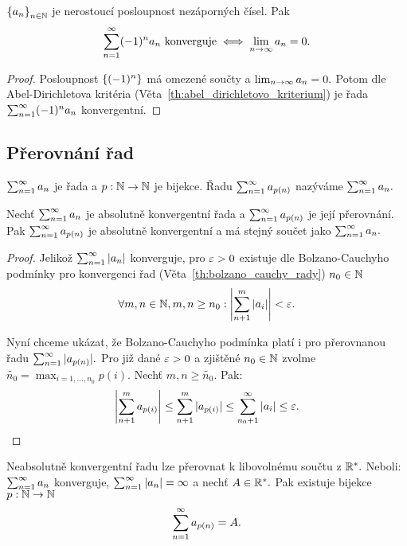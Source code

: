 \begin{theorem}
    \Necht $\left\{a_n\right\}_{n\in\mathbb{N}}$ je nerostoucí posloupnost nezáporných čísel.
    Pak
    $$\sum_{n=1}^\infty (-1)^na_n \text{ konverguje} \iff \lim_{n \to \infty} a_n = 0.$$
\end{theorem}

\begin{proof}
    Posloupnost $\left\{(-1)^n\right\}$ má omezené součty a $\lim_{n \to \infty} a_n = 0.$ Potom
    dle Abel-Dirichletova kritéria (Věta~\ref{th:abel_dirichletovo_kriterium})
    je řada $\sum_{n=1}^\infty (-1)^na_n$ konvergentní.
\end{proof}

\subsection{Přerovnání řad}

\begin{definition}
    \Necht $\sum_{n=1}^\infty a_n$ je řada a $p: \mathbb{N} \rightarrow \mathbb{N}$ je bijekce. Řadu 
    $\sum_{n=1}^\infty a_{p(n)}$ nazýváme  $\sum_{n=1}^\infty a_n.$
\end{definition}

\begin{theorem}
    Nechť $\sum_{n=1}^\infty a_n$ je absolutně konvergentní řada a $\sum_{n=1}^\infty a_{p(n)}$ je její
    přerovnání. Pak $\sum_{n=1}^\infty a_{p(n)}$ je absolutně konvergentní a má stejný součet
    jako $\sum_{n=1}^\infty a_n.$
\end{theorem}

\begin{proof}
    Jelikož $\sum_{n=1}^\infty |a_n|$ konverguje, pro $\varepsilon > 0$ existuje dle Bolzano-Cauchyho
    podmínky pro konvergenci řad (Věta~\ref{th:bolzano_cauchy_rady}) 
    $n_0 \in \mathbb{N}$ \tz
    $$\forall m,n \in \mathbb{N}, m,n \geq n_0: \left|\sum_{n+1}^m |a_i|\right| < \varepsilon.$$
    
    Nyní chceme ukázat, že Bolzano-Cauchyho podmínka platí i pro 
    přerovnanou řadu $\sum_{n=1}^\infty |a_{p(n)}|.$ Pro již dané $\varepsilon > 0$ a zjištěné 
    $n_0 \in \mathbb{N}$ zvolme
    $\widetilde{n_0} = \max_{i=1, \dots, n_0} p(i).$ Nechť $m,n\geq 
    \widetilde{n_0}.$ Pak:
    $$\left|\sum_{n+1}^m a_{p(i)}\right| 
    \leq \sum_{n+1}^m |a_{p(i)}| 
    \leq \sum_{n_0+1}^\infty |a_i| 
    \leq \varepsilon.$$
\end{proof}

\begin{theorem}[Riemann]
    Neabsolutně konvergentní řadu lze přerovnat k libovolnému součtu z $\mathbb{R}^*.$
    Neboli: \Necht $\sum_{n=1}^\infty a_n$ konverguje, $\sum_{n=1}^\infty |a_n| = \infty$ a nechť 
    $A \in \mathbb{R}^*.$ Pak existuje bijekce $p: \mathbb{N} \rightarrow \mathbb{N}$ \tz
    $$\sum_{n=1}^\infty a_{p(n)} = A.$$
\end{theorem}

